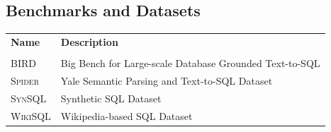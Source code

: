 \vspace{1em}

\subsection*{Benchmarks and Datasets}

\begin{tabular}{ll}

\textbf{Name} & \textbf{Description} \\
\\
\textsc{BIRD}    & Big Bench for Large-scale Database Grounded Text-to-SQL \\
\textsc{Spider}  & Yale Semantic Parsing and Text-to-SQL Dataset \\
\textsc{SynSQL}  & Synthetic SQL Dataset \\
\textsc{WikiSQL} & Wikipedia-based SQL Dataset \\
\end{tabular}
